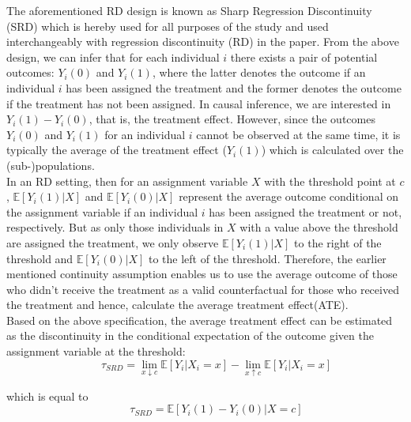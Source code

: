 \documentclass[fleqn]{article}
\begin{document}
    The aforementioned RD design is known as Sharp Regression Discontinuity (SRD) which is hereby used for all purposes of the study and used interchangeably with regression discontinuity (RD) in the paper. From the above design, we can infer that for each individual $i$ there exists a pair of potential outcomes: $Y_{i}(0)$ and $Y_{i}(1)$, where the latter denotes the outcome if an individual $i$ has been assigned the treatment and the former denotes the outcome if the treatment has not been assigned. In causal inference, we are interested in $Y_{i}(1) - Y_{i}(0)$, that is, the treatment effect. However, since the outcomes $Y_{i}(0)$ and $Y_{i}(1)$ for an individual $i$ cannot be observed at the same time, it is typically the average of the treatment effect ($Y_{i}(1)$) which is calculated over the (sub-)populations\cite{imbens2008regression}. \\

    In an RD setting, then for an assignment variable $X$ with the threshold point at $c$, $\mathbb{E} [ Y_{i}(1) | X ]$ and $\mathbb{E} [ Y_{i}(0) | X ]$ represent the average outcome conditional on the assignment variable if an individual $i$ has been assigned the treatment or not, respectively. But as only those individuals in $X$ with a value above the threshold are assigned the treatment, we only observe $\mathbb{E} [ Y_{i}(1) | X ]$ to the right of the threshold and $\mathbb{E} [ Y_{i}(0) | X ]$ to the left of the threshold. Therefore, the earlier mentioned continuity assumption enables us to use the average outcome of those who didn't receive the treatment as a valid counterfactual for those who received the treatment and hence, calculate the average treatment effect(ATE)\cite{lee2010regression}.\\

    Based on the above specification, the average treatment effect can be estimated as the discontinuity in the conditional expectation of the outcome given the assignment variable at the threshold: \\
    \begin{equation*}
        \qquad \tau_{SRD} = \lim_{x\downarrow c} \mathbb{E}[Y_{i} | X_{i}=x] - \lim_{x\uparrow c} \mathbb{E}\left[Y_{i} | X_{i}=x\right]    
    \end{equation*}

    which is equal to \\
    \begin{equation*}
        \qquad \tau_{SRD} = \mathbb{E}\left[Y_{i}(1) - Y_{i}(0)| X = c\right]    
    \end{equation*}
\end{document}

